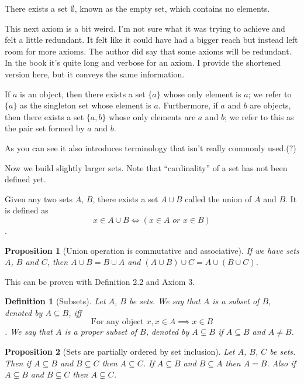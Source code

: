 \documentclass[12pt]{article}
\newtheorem{proposition}{Proposition}[section]
\newtheorem{definition}{Definition}[section]
\theoremstyle{remark}
\begin{document}

\begin{important}
     There exists a set $ \emptyset $, known as the empty set, which contains no elements. 
\end{important}


This next axiom is a bit weird. I'm not sure what it was trying to achieve and felt a little redundant. It felt like it could have had a bigger reach but instead left room for more axioms. The author did say that some axioms will be redundant. In the book it's quite long and verbose for an axiom. I provide the shortened version here, but it conveys the same information. 


\begin{important}
 	If $ a $ is an object, then there exists a set $ \{a\} $ whose only element is $ a $; we refer to $ \{a\} $ as the singleton set whose element is $ a $. Furthermore, if $ a $ and $ b $ are objects, then there exists a set $ \{a,b\} $ whose only elements are $ a $ and $ b $; we refer to this as the pair set formed by $ a $ and $ b $.
\end{important}

As you can see it also introduces terminology that isn't really commonly used.(?) \par 

Now we build slightly larger sets. Note that ``cardinality'' of a set has not been defined yet. 


\begin{important}
 	Given any two sets $ A $, $ B $, there exists a set $ A \cup B $ called the union of $ A $ and $ B $. It is defined as \[ x \in A \cup B \iff (x \in A \textit{ or } x \in B) \].
\end{important}


\begin{proposition}[Union operation is commutative and associative]
    If we have sets $ A $, $ B $ and $ C $, then $ A \cup B = B \cup A $ and $ (A \cup B) \cup C = A \cup (B \cup C) $.
\end{proposition}

This can be proven with Definition 2.2 and Axiom 3.


\begin{definition}[Subsets]
	Let $ A $, $ B $ be sets. We say that $ A $ is a \textit{subset} of $ B $, denoted by $ A \subseteq B $, iff \[ \text{For any object } x, x \in A \implies x \in B \].
	We say that $ A $ is a proper subset of $ B $, denoted by $ A \subsetneq B $ if $ A \subseteq B $ and $ A \neq B $.
\end{definition}


\begin{proposition}[Sets are partially ordered by set inclusion]
    Let $ A $, $ B $, $ C $ be sets. Then if $ A \subseteq B $ and $ B \subseteq C $ then $ A \subseteq C $. If $ A \subseteq B $ and $ B \subseteq A $ then $ A = B $. Also if $ A \subsetneq B $ and $ B \subsetneq C $ then $ A \subsetneq C $.
\end{proposition}
\end{document}
